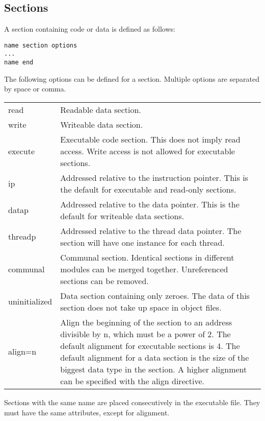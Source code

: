 \documentclass[forwardcom.tex]{subfiles}
\begin{document}
\subsection{Sections} \label{assemblySections}
A section containing code or data is defined as follows:
\begin{lstlisting}[frame=single]
name section options
...
name end
\end{lstlisting}
\vspace{2mm}

The following options can be defined for a section. Multiple options are separated by space or comma.

\begin{tabular}{|p{20mm}p{150mm}|}
\hline
read & Readable data section. \\
write & Writeable data section. \\
execute & Executable code section. This does not imply read access. Write access is not allowed for executable sections. \\
ip & Addressed relative to the instruction pointer. This is the default for executable and read-only sections. \\
datap & Addressed relative to the data pointer. This is the default for writeable data sections. \\
threadp & Addressed relative to the thread data pointer. The section will have one instance for each thread. \\
communal & Communal section. Identical sections in different modules can be merged together. Unreferenced sections can be removed. \\
uninitialized & Data section containing only zeroes. The data of this section does not take up space in object files.\\
align=n & Align the beginning of the section to an address divisible by n, which must be a power of 2.
The default alignment for executable sections is 4. The default alignment for a data section is the size of the biggest data type in the section. A higher alignment can be specified with the align directive.\\
\hline
\end{tabular}
\vspace{2mm}

Sections with the same name are placed consecutively in the executable file. They must have the same attributes, except for alignment.
\vspace{2mm}
\end{document}
